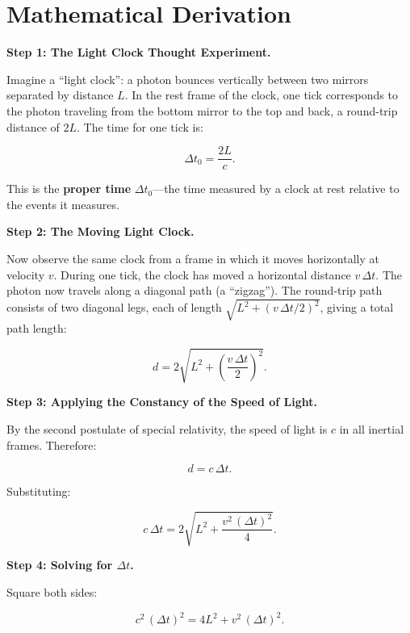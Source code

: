 \section*{Mathematical Derivation}

\textbf{Step 1: The Light Clock Thought Experiment.}

Imagine a ``light clock'': a photon bounces vertically between two mirrors separated by distance $L$. In the rest frame of the clock, one tick corresponds to the photon traveling from the bottom mirror to the top and back, a round-trip distance of $2L$. The time for one tick is:

\begin{equation}
\Delta t_0 = \frac{2L}{c}.
\end{equation}

This is the \textbf{proper time} $\Delta t_0$---the time measured by a clock at rest relative to the events it measures.

\textbf{Step 2: The Moving Light Clock.}

Now observe the same clock from a frame in which it moves horizontally at velocity $v$. During one tick, the clock has moved a horizontal distance $v\,\Delta t$. The photon now travels along a diagonal path (a ``zigzag''). The round-trip path consists of two diagonal legs, each of length $\sqrt{L^2 + (v\,\Delta t/2)^2}$, giving a total path length:

\begin{equation}
d = 2\sqrt{L^2 + \left(\frac{v\,\Delta t}{2}\right)^2}.
\end{equation}

\textbf{Step 3: Applying the Constancy of the Speed of Light.}

By the second postulate of special relativity, the speed of light is $c$ in all inertial frames. Therefore:

\begin{equation}
d = c\,\Delta t.
\end{equation}

Substituting:

\begin{equation}
c\,\Delta t = 2\sqrt{L^2 + \frac{v^2\,(\Delta t)^2}{4}}.
\end{equation}

\textbf{Step 4: Solving for $\Delta t$.}

Square both sides:

\begin{equation}
c^2\,(\Delta t)^2 = 4L^2 + v^2\,(\Delta t)^2.
\end{equation}

